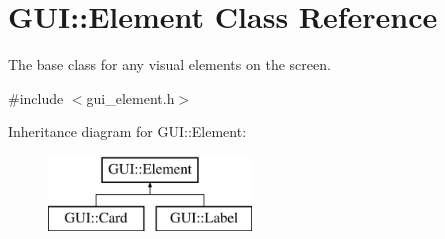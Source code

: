 \hypertarget{classGUI_1_1Element}{\section{G\-U\-I\-:\-:Element Class Reference}
\label{classGUI_1_1Element}
}


The base class for any visual elements on the screen.  




{\ttfamily \#include $<$gui\-\_\-element.\-h$>$}

Inheritance diagram for G\-U\-I\-:\-:Element\-:\begin{figure}[H]
\begin{center}
\leavevmode
\includegraphics[height=2.000000cm]{classGUI_1_1Element}
\end{center}
\end{figure}
